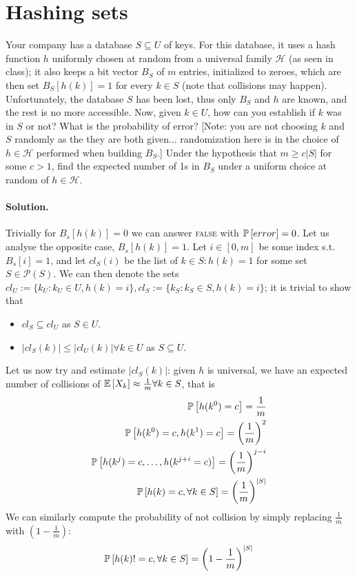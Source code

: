 \section{Hashing sets}

Your company has a database $S \subseteq U$ of keys. For this database, it uses a hash function $h$ uniformly chosen at random from a universal family $\mathcal{H}$ (as seen in class); it also keeps a bit vector $B_S$ of $m$ entries, initialized to zeroes, which are then set $B_S[h(k)] = 1$ for every $k \in S$ (note that collisions may happen). Unfortunately, the database $S$ has been lost, thus only $B_S$ and $h$ are known, and the rest is no more accessible. Now, given $k \in U$, how can you establish if $k$ was in $S$ or not? What is the probability of error? [Note: you are not choosing $k$ and $S$ randomly as the they are both given... randomization here is in the choice of $h \in \mathcal{H}$ performed when building $B_S$.] Under the hypothesis that $m \geq c|S|$ for some $c > 1$, find the expected number of 1s in $B_S$ under a uniform choice at random of $h \in \mathcal{H}$.

\vspace{0.5cm}
\paragraph{Solution.}
Trivially for $B_s[h(k)] = 0$ we can answer \textsc{false} with $\operatorname*{\mathbb{P}}\left[{error}\right] = 0$.
Let us analyse the opposite case, $B_s[h(k)] = 1$.
Let $i \in [0,m]$ be some index s.t. $B_s[i] = 1$, and let $cl_{S}(i)$ be the list of $k \in S: h(k) = 1$ for some set $S \in \displaystyle {\mathcal {P}}(S)$.
We can then denote the sets $cl_{U} := \{k_{U} : k_{U} \in U, h(k) = i\}, cl_{S} := \{k_{S} : k_{S} \in S, h(k) = i\}$; it is trivial to show that
    \begin{itemize}
    \label{6_cl_inclusion} \item $cl_{S} \subseteq cl_{U}$ as $S \in U$.
    \label{6_cl_length} \item $| cl_{S}(k) | \leq | cl_{U}(k) | \forall k \in U$ as $S \subseteq U$.
    \end{itemize}
Let us now try and estimate $|cl_{S}(k)|$: given $h$ is universal, we have an expected number of collisions of $\mathbb{E}\left[{X_{k}}\right] \approx \frac{1}{m} \forall k \in S$, that is
\begin{align*}
    \operatorname*{\mathbb{P}}\left[{h(k^{0}) = c}\right] = \frac{1}{m}                               					\\
    \operatorname*{\mathbb{P}}\left[{h(k^{0}) = c, h(k^{1}) = c}\right] = \left(\frac{1}{m}\right)^{2}                    \\
    \operatorname*{\mathbb{P}}\left[{h(k^{j}) = c, \dots, h(k^{j + i} = c)}\right] = \left(\frac{1}{m}\right)^{j - i}    	\\
    \operatorname*{\mathbb{P}}\left[{h(k) = c, \forall k \in S}\right] = \left(\frac{1}{m}\right)^{|S|}
\end{align*}
We can similarly compute the probability of not collision by simply replacing $\frac{1}{m}$ with $(1 - \frac{1}{m})$:
\begin{equation*}
  \operatorname*{\mathbb{P}}\left[{h(k) != c, \forall k \in S}\right] = \left(1 - \frac{1}{m}\right)^{|S|}
\end{equation*}

